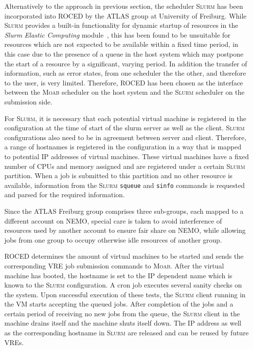 Alternatively to the approach in previous section, the
scheduler \textsc{Slurm} has been incorporated into ROCED by
the ATLAS group at University of Freiburg.
While \textsc{Slurm} provides a built-in functionality for dynamic
startup of resources in the \textit{Slurm Elastic Computing} module~\cite{SlurmElastic}, this has been found to be unsuitable for resources which are not
expected to be available within a fixed time period, in this case due to
the presence of a queue in the host system which may postpone the start
of a resource by a significant, varying period.
In addition the transfer of information, such as error states, from one scheduler the the
other, and therefore to the user, is very limited.
Therefore, ROCED has been chosen as the interface between the
\textsc{Moab} scheduler on the host system and the \textsc{Slurm}
scheduler on the submission side.

For \textsc{Slurm}, it is necessary that each potential virtual
machine is registered in the configuration at the time of start of the
slurm server as well as the client. \textsc{Slurm} configurations also
need to be in agreement between server and client.
Therefore, a range of hostnames is registered in the configuration in
a way that is mapped to potential IP addresses of virtual machines.
These virtual machines have a fixed number of CPUs and memory assigned and are
registered under a certain \textsc{Slurm} partition.
When a job is submitted to this partition and no other resource is
available, information from the \textsc{Slurm} \texttt{squeue} and
\texttt{sinfo} commands is requested and parsed for the required information.

Since the ATLAS Freiburg group comprises three sub-groups, each mapped
to a different account on NE\-MO, special care is taken to
avoid interference of resources used by another account to ensure fair share on NEMO, while
allowing jobs from one group to occupy otherwise idle resources of another group.

ROCED determines the amount of virtual machines to be started and sends the
corresponding VRE job submission commands to \textsc{Moab}.
After the virtual machine has booted, the hostname is set to the IP
dependent name which is known to the \textsc{Slurm} configuration.
A cron job executes several sanity
checks on the system.
Upon successful execution of these tests, the \textsc{Slurm} client
running in the VM starts accepting the queued jobs.
After completion of the jobs and a certain period of receiving no new jobs from the queue, the
\textsc{Slurm} client in the machine drains itself and the machine
shuts itself down.
The IP address as well as the corresponding hostname in \textsc{Slurm}
are released and can be reused by future VREs.

